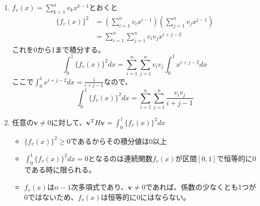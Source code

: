 \begin{souanswer}
\begin{enumerate}
	\item $f_v(x)= \sum_{k= 1}^n v_kx^{k- 1}$とおくと
\begin{align*}
	\{f_v(x)\}^2
	&= \left(\sum_{i= 1}^n v_ix^{i- 1}\right)\left(\sum_{j= 1}^n v_jx^{j- 1}\right)\\
	&= \sum_{i= 1}^n\sum_{j= 1}^n v_iv_j x^{i+ j- 2}
\end{align*}
	これを0から1まで積分する。
\begin{equation*}
	\int_0^1\{f_v(x)\}^2 dx= \sum_{i= 1}^n \sum_{j= 1}^n v_iv_j \int_0^1 x^{i+ j-2} dx
\end{equation*}
	ここで$\int_0^1 x^{i+ j- 2} dx= \frac{1}{i+ j- 1}$なので、
\begin{equation*}
	\int_0^1\{f_v(x)\}^2 dx= \sum_{i= 1}^n \sum_{j= 1}^n\frac{v_iv_j}{i+ j- 1}
\end{equation*}

	\item 任意の$\bm{v}\ne 0$に対して、$\bm{v}^\mathrm{T}H\bm{v}= \int_0^1 \{f_v(x)\}^2 dx$
\begin{itemize}
	\item $\{f_v(x)\}^2\ge 0$であるからその積分値は0以上
	\item $\int_0^1 \{f_v(x)\}^2 dx= 0$となるのは連続関数$f_v(x)$が区間$[0, 1]$で恒等的に0である時に限られる。
	\item $f_v(x)$は$n- 1$次多項式であり、$\bm{v}\ne 0$であれば、係数の少なくとも1つが0ではないため、$f_v(x)$は恒等的に0にはならない。
\end{itemize}
\end{enumerate}
\end{souanswer}
